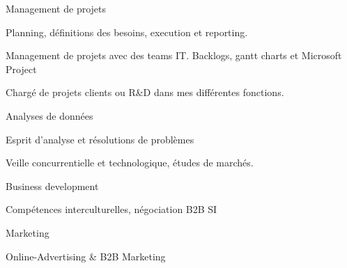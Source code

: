 

\begin{cventries}
	
	\zcventry
	{Management de projets} %
	{
		\begin{cvitems} %
			\item {Planning, définitions des besoins, execution et reporting.}
			\item {Management de projets avec des teams IT. Backlogs, gantt charts et Microsoft Project}
			\item {Chargé de projets clients ou R\&D dans mes différentes fonctions.}
		\end{cvitems}
	}
	
	\zcventry
	{Analyses de données} %
	{
		\begin{cvitems} %
			\item {Esprit d'analyse et résolutions de problèmes}
			\item {Veille concurrentielle et technologique, études de marchés.}
		\end{cvitems}
	}
	
	\zcventry
	{Business development} %
	{
		\begin{cvitems} %
			\item {Compétences interculturelles, négociation B2B SI}
		\end{cvitems}
	}
	
	\zcventry
	{Marketing} %
	{
		\begin{cvitems} %
			\item {Online-Advertising \& B2B Marketing}
		\end{cvitems}
	}
	
\end{cventries}


